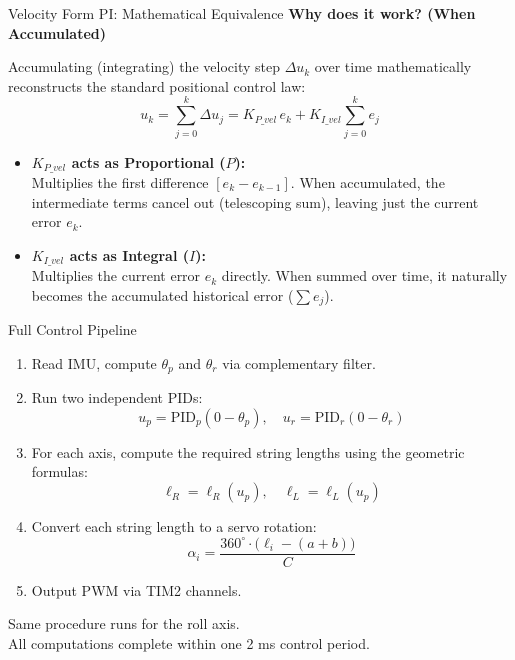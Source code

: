 \documentclass[10pt]{beamer}
\begin{document}
\begin{frame}{Velocity Form PI: Mathematical Equivalence}
  \textbf{Why does it work? (When Accumulated)}
  
  Accumulating (integrating) the velocity step $\Delta u_k$ over time mathematically reconstructs the standard positional control law:
  \[
    u_k = \sum_{j=0}^{k} \Delta u_j = K_{P\_vel}\, e_k + K_{I\_vel} \sum_{j=0}^{k} e_j
  \]

  \vspace{0.2cm}
   
  \begin{itemize}

    \item \textbf{$K_{P\_vel}$ acts as Proportional ($P$):} \\
    Multiplies the first difference $[e_k - e_{k-1}]$. When accumulated, the intermediate terms cancel out (telescoping sum), leaving just the current error $e_k$.
    
    \vspace{0.2cm}
    
    \item \textbf{$K_{I\_vel}$ acts as Integral ($I$):} \\
    Multiplies the current error $e_k$ directly. When summed over time, it naturally becomes the accumulated historical error ($\sum e_j$).
  \end{itemize}
\end{frame}


\begin{frame}{Full Control Pipeline}
  \begin{enumerate}
    \item Read IMU, compute $\theta_p$ and $\theta_r$ via complementary filter.
    \item Run two independent PIDs:
      \[ u_p = \mathrm{PID}_p(0 - \theta_p), \quad u_r = \mathrm{PID}_r(0 - \theta_r) \]
    \item For each axis, compute the required string lengths using the geometric formulas:
      \[ \ell_R = \ell_R(u_p), \quad \ell_L = \ell_L(u_p) \]
    \item Convert each string length to a servo rotation:
      \[ \alpha_i = \frac{360^\circ \cdot \bigl(\ell_i - (a+b)\bigr)}{C} \]
    \item Output PWM via TIM2 channels.
  \end{enumerate}

  Same procedure runs for the roll axis.\\
  All computations complete within one 2 ms control period.
\end{frame}
\end{document}
